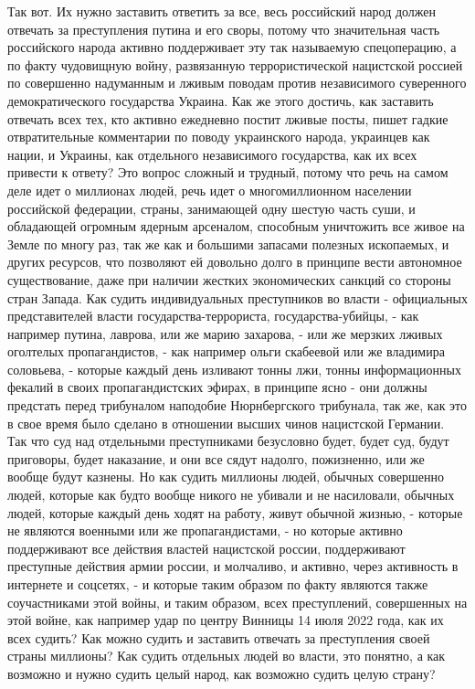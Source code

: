 Так вот. Их нужно заставить ответить за все, весь российский народ должен
отвечать за преступления путина и его своры, потому что значительная часть
российского народа активно поддерживает эту так называемую спецоперацию, а по
факту чудовищную войну, развязанную террористической нацистской россией по
совершенно надуманным и лживым поводам против независимого суверенного
демократического государства Украина. Как же этого достичь, как заставить
отвечать всех тех, кто активно ежедневно постит лживые посты, пишет гадкие
отвратительные комментарии по поводу украинского народа, украинцев как нации, и
Украины, как отдельного независимого государства, как их всех привести к
ответу? Это вопрос сложный и трудный, потому что речь на самом деле идет о
миллионах людей, речь идет о многомиллионном населении российской федерации,
страны, занимающей одну шестую часть суши, и обладающей огромным ядерным
арсеналом, способным уничтожить все живое на Земле по многу раз, так же как и
большими запасами полезных ископаемых, и других ресурсов, что позволяют ей
довольно долго в принципе вести автономное существование, даже при наличии
жестких экономических санкций со стороны стран Запада.  Как судить
индивидуальных преступников во власти - официальных представителей власти
государства-террориста, государства-убийцы, - как например путина, лаврова, или
же марию захарова, - или же мерзких лживых оголтелых пропагандистов, - как
например ольги скабеевой или же владимира соловьева, - которые каждый день
изливают тонны лжи, тонны информационных фекалий в своих пропагандистских
эфирах, в принципе ясно - они должны предстать перед трибуналом наподобие
Нюрнбергского трибунала, так же, как это в свое время было сделано в отношении
высших чинов нацистской Германии.  Так что суд над отдельными преступниками
безусловно будет, будет суд, будут приговоры, будет наказание, и они все сядут
надолго, пожизненно, или же вообще будут казнены.  Но как судить миллионы
людей, обычных совершенно людей, которые как будто вообще никого не убивали и
не насиловали, обычных людей, которые каждый день ходят на работу, живут
обычной жизнью, - которые не являются военными или же пропагандистами, - но
которые активно поддерживают все действия властей нацистской россии,
поддерживают преступные действия армии россии, и молчаливо, и активно, через
активность в интернете и соцсетях, - и которые таким образом по факту являются
также соучастниками этой войны, и таким образом, всех преступлений, совершенных
на этой войне, как например удар по центру Винницы 14 июля 2022 года, как их
всех судить? Как можно судить и заставить отвечать за преступления своей страны
миллионы? Как судить отдельных людей во власти, это понятно, а как возможно и
нужно судить целый народ, как возможно судить целую страну?


